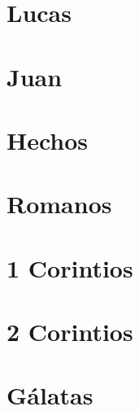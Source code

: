 \chapter{Lucas}
\begin{multicols}{2}
  \parskip=0pt \relax
  
\end{multicols}

\chapter{Juan}
\begin{multicols}{2}
  \parskip=0pt \relax
  
\end{multicols}

\chapter{Hechos}
\begin{multicols}{2}
  \parskip=0pt \relax
  
\end{multicols}

\chapter{Romanos}
\begin{multicols}{2}
  \parskip=0pt \relax
  
\end{multicols}

\chapter{1 Corintios}
\begin{multicols}{2}
  \parskip=0pt \relax
  
\end{multicols}

\chapter{2 Corintios}
\begin{multicols}{2}
  \parskip=0pt \relax
  
\end{multicols}

\chapter{Gálatas}
\begin{multicols}{2}
  \parskip=0pt \relax
  
\end{multicols}

